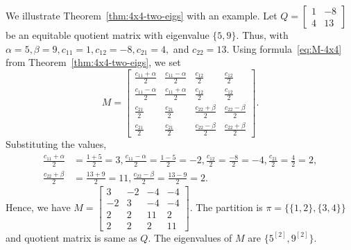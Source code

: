 \documentclass[12pt,twoside]{article}
\begin{document}
We illustrate Theorem~\ref{thm:4x4-two-eigs} with an example. Let $Q=
	\begin{bmatrix}
		1 & -8\\
		4 & 13
	\end{bmatrix}$ be an equitable quotient matrix with eigenvalue $\{5,9\}.$	Thus, with $\alpha = 5, \beta = 9,	c_{11}=1, c_{12}=-8, c_{21}=4,$ and $ c_{22}=13.$ 	Using formula~\eqref{eq:M-4x4} from Theorem~\ref{thm:4x4-two-eigs}, we set
	$$
	M=
	\begin{bmatrix}
		\displaystyle \frac{c_{11}+\alpha}{2} & \displaystyle \frac{c_{11}-\alpha}{2} & \displaystyle \frac{c_{12}}{2} & \displaystyle \frac{c_{12}}{2}\\
		\displaystyle \frac{c_{11}-\alpha}{2} & \displaystyle \frac{c_{11}+\alpha}{2} & \displaystyle \frac{c_{12}}{2} & \displaystyle \frac{c_{12}}{2}\\
		\displaystyle \frac{c_{21}}{2} & \displaystyle \frac{c_{21}}{2} & \displaystyle \frac{c_{22}+\beta}{2} & \displaystyle \frac{c_{22}-\beta}{2}\\
		\displaystyle \frac{c_{21}}{2} & \displaystyle \frac{c_{21}}{2} & \displaystyle \frac{c_{22}-\beta}{2} & \displaystyle \frac{c_{22}+\beta}{2}
	\end{bmatrix}.
	$$
	Substituting the values,
	\begin{align*}
	\frac{c_{11}+\alpha}{2} &= \frac{1+5}{2}=3,
	\frac{c_{11}-\alpha}{2} = \frac{1-5}{2}=-2,
	\frac{c_{12}}{2} = \frac{-8}{2}=-4,
	\frac{c_{21}}{2} = \frac{4}{2}=2,\\
	\frac{c_{22}+\beta}{2} &= \frac{13+9}{2}=11,
	\frac{c_{22}-\beta}{2} = \frac{13-9}{2}=2.
	\end{align*}
	Hence, we have $M=
	\begin{bmatrix}
		3 & -2 & -4 & -4\\
		-2 & 3 & -4 & -4\\
		2 & 2 & 11 & 2\\
		2 & 2 & 2 & 11
	\end{bmatrix}.$ The partition is  $\pi=\bigl\{\{1,2\},\{3,4\}\bigr\}$ and quotient matrix is same as $Q$. The eigenvalues of $M$ are $\{5^{[2]},9^{[2]}\}.$
\end{document}
